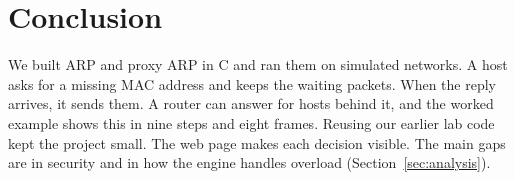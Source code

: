 \section{Conclusion}\label{sec:conclusion}

We built ARP and proxy ARP in C and ran them on simulated networks. A host asks for a missing MAC address and keeps the waiting packets. When the reply arrives, it sends them. A router can answer for hosts behind it, and the worked example shows this in nine steps and eight frames. Reusing our earlier lab code kept the project small. The web page makes each decision visible. The main gaps are in security and in how the engine handles overload (Section~\ref{sec:analysis}).
